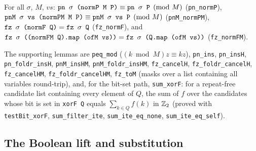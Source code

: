 \begin{proposition}\label{prop:lean-pathsum-norm}
For all $\sigma$, $M$, $vs$:
$\textnormal{\texttt{pn \ensuremath{\sigma} (\allowbreak{}normP M P)}} \equiv \textnormal{\texttt{pn \ensuremath{\sigma} P}}\pmod M$ (\textnormal{\texttt{pn\_\allowbreak{}normP}}),
$\textnormal{\texttt{pnM \ensuremath{\sigma} vs (\allowbreak{}normPM M P)}}\equiv\textnormal{\texttt{pnM \ensuremath{\sigma} vs P}}\pmod M$ (\textnormal{\texttt{pnM\_\allowbreak{}normPM}}),
$\textnormal{\texttt{fz \ensuremath{\sigma} (\allowbreak{}normF Q)}} = \textnormal{\texttt{fz \ensuremath{\sigma} Q}}$ (\textnormal{\texttt{fz\_\allowbreak{}normF}}), and
$\textnormal{\texttt{fz \ensuremath{\sigma} (\allowbreak{}(\allowbreak{}normFM Q).\allowbreak{}map (\allowbreak{}ofM vs))}} = \textnormal{\texttt{fz \ensuremath{\sigma} (\allowbreak{}Q.\allowbreak{}map (\allowbreak{}ofM vs))}}$ (\textnormal{\texttt{fz\_\allowbreak{}normFM}}).
\end{proposition}
\noindent The supporting lemmas are \textnormal{\texttt{peq\_\allowbreak{}mod}} ($(k\bmod M)z\equiv kz$), \textnormal{\texttt{pn\_\allowbreak{}ins}},
\textnormal{\texttt{pn\_\allowbreak{}insH}}, \textnormal{\texttt{pn\_\allowbreak{}foldr\_\allowbreak{}insH}}, \textnormal{\texttt{pnM\_\allowbreak{}insHM}}, \textnormal{\texttt{pnM\_\allowbreak{}foldr\_\allowbreak{}insHM}}, \textnormal{\texttt{fz\_\allowbreak{}cancelH}},
\textnormal{\texttt{fz\_\allowbreak{}foldr\_\allowbreak{}cancelH}}, \textnormal{\texttt{fz\_\allowbreak{}cancelHM}}, \textnormal{\texttt{fz\_\allowbreak{}foldr\_\allowbreak{}cancelHM}}, \textnormal{\texttt{fz\_\allowbreak{}toM}} (masks over a
list containing all variables round-trip), and, for the bit-set path, \textnormal{\texttt{sum\_\allowbreak{}xorF}}: for a
repeat-free candidate list containing every element of $Q$, the sum of $f$ over the candidates
whose bit is set in \textnormal{\texttt{xorF Q}} equals $\sum_{k\in Q} f(k)$ in $\mathbb{Z}_{2}$ (proved with
\textnormal{\texttt{testBit\_\allowbreak{}xorF}}, \textnormal{\texttt{sum\_\allowbreak{}filter\_\allowbreak{}ite}}, \textnormal{\texttt{sum\_\allowbreak{}ite\_\allowbreak{}eq\_\allowbreak{}none}}, \textnormal{\texttt{sum\_\allowbreak{}ite\_\allowbreak{}eq\_\allowbreak{}self}}).

\subsection{The Boolean lift and substitution}

